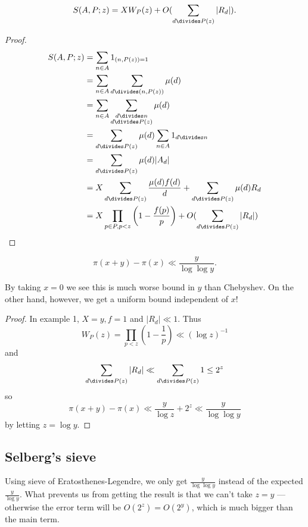 \documentclass[a4paper]{article}
\begin{document}
\begin{theorem}
  \[
    S(A, P; z) = XW_P(z) + O(\sum_{d \divides P(z)} |R_d|).
  \]
\end{theorem}

\begin{proof}
  \begin{align*}
    S(A, P; z)
    &= \sum_{n \in A} 1_{(n, P(z)) = 1} \\
    &= \sum_{n \in A} \sum_{d \divides (n, P(z))} \mu(d) \\
    &= \sum_{n \in A} \sum_{\substack{d \divides n \\ d \divides P(z)}} \mu(d) \\
    &= \sum_{d \divides P(z)} \mu(d) \sum_{n \in A} 1_{d \divides n} \\
    &= \sum_{d \divides P(z)} \mu(d) |A_d| \\
    &= X \sum_{d \divides P(z)} \frac{\mu(d) f(d)}{d} + \sum_{d \divides P(z)} \mu(d) R_d \\
    &= X \prod_{p \in P, p < z} \left(1 - \frac{f(p)}{p} \right) + O(\sum_{d \divides P(z)} |R_d|)
  \end{align*}
\end{proof}

\begin{corollary}
  \[
    \pi(x + y) - \pi(x) \ll \frac{y}{\log \log y}.
  \]
\end{corollary}
By taking \(x = 0\) we see this is much worse bound in \(y\) than Chebyshev. On the other hand, however, we get a uniform bound independent of \(x\)!

\begin{proof}
  In example 1, \(X = y, f = 1\) and \(|R_d| \ll 1\). Thus
  \[
    W_P(z)
    = \prod_{p < z} \left( 1 - \frac{1}{p} \right)
    \ll (\log z)^{-1}
  \]
  and
  \[
    \sum_{d \divides P(z)} |R_d| \ll \sum_{d \divides P(z)} 1 \leq 2^z
  \]
  so
  \[
    \pi(x + y) - \pi(x) \ll \frac{y}{\log z} + 2^z \ll \frac{y}{\log \log y}
  \]
  by letting \(z = \log y\).
\end{proof}

\subsection{Selberg's sieve}

Using sieve of Eratosthenes-Legendre, we only get \(\frac{y}{\log\log y}\) instead of the expected \(\frac{y}{\log y}\). What prevents us from getting the result is that we can't take \(z = y\) --- otherwise the error term will be \(O(2^z) = O(2^y)\), which is much bigger than the main term.
\end{document}
